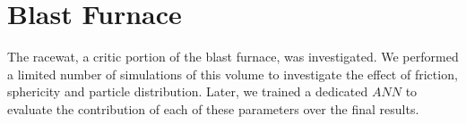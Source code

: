
\chapter{Blast Furnace}
\label{cap:blastfurnace}

The racewat, a critic portion of the blast furnace, was investigated. We
performed a limited number of simulations of this volume to investigate the
effect of friction, sphericity and particle distribution.
Later, we trained a dedicated $ANN$ to evaluate the contribution of each of
these parameters over the final results.

